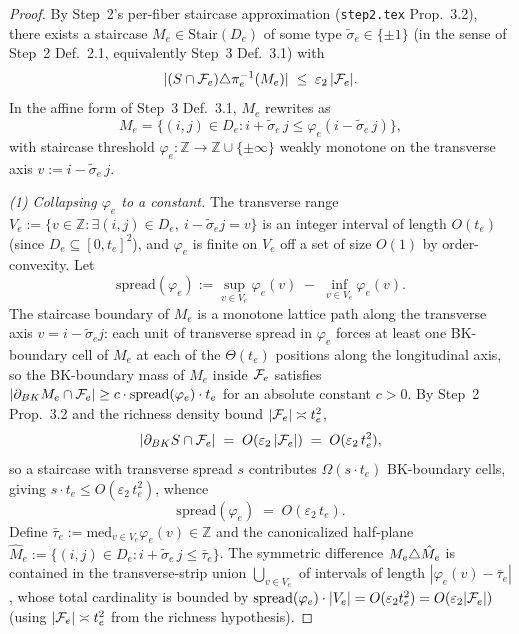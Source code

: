 \begin{proof}
By Step~2's per-fiber staircase approximation (\texttt{step2.tex}
Prop.~3.2), there exists a staircase
$M_e\in\mathrm{Stair}(D_e)$ of some type $\tilde\sigma_e\in\{\pm 1\}$
(in the sense of Step~2 Def.~2.1, equivalently Step~3 Def.~3.1) with
\[
  |(S\cap\mathcal{F}_{e})\triangle\pi_e^{-1}(M_e)| \;\le\; \varepsilon_2\,|\mathcal{F}_{e}|.
\]
In the affine form of Step~3 Def.~3.1, $M_e$ rewrites as
\begin{equation}\label{eq:affine-staircase}
  M_e = \bigl\{(i,j)\in D_e : i+\tilde\sigma_e\,j \le \varphi_e(i-\tilde\sigma_e\,j)\bigr\},
\end{equation}
with staircase threshold
$\varphi_e\colon\mathbb{Z}\to\mathbb{Z}\cup\{\pm\infty\}$ weakly
monotone on the transverse axis $v:=i-\tilde\sigma_e\,j$.

\smallskip
\noindent\emph{(1) Collapsing $\varphi_e$ to a constant.}
The transverse range
$V_e:=\{v\in\mathbb{Z}:\exists(i,j)\in D_e,\ i-\tilde\sigma_ej=v\}$
is an integer interval of length $O(t_e)$ (since $D_e\subseteq
[0,t_e]^2$), and $\varphi_e$ is finite on $V_e$ off a set of size
$O(1)$ by order-convexity.  Let
\[
  \mathrm{spread}(\varphi_e) := \sup_{v\in V_e}\varphi_e(v)\;-\;\inf_{v\in V_e}\varphi_e(v).
\]
The staircase boundary of $M_e$ is a monotone lattice path along the
transverse axis $v=i-\tilde\sigma_e j$: each unit of transverse spread
in $\varphi_e$ forces at least one BK-boundary cell of $M_e$ at each
of the $\Theta(t_e)$ positions along the longitudinal axis, so the
BK-boundary mass of $M_e$ inside $\mathcal{F}_{e}$ satisfies
$|\partial_{BK}M_e\cap\mathcal{F}_{e}|\ge c\cdot\mathrm{spread}(\varphi_e)\cdot t_e$
for an absolute constant $c>0$.  By Step~2 Prop.~3.2 and the richness
density bound $|\mathcal{F}_{e}|\asymp t_e^2$,
\[
  |\partial_{BK}S\cap\mathcal{F}_{e}| \;=\; O(\varepsilon_2\,|\mathcal{F}_{e}|)
  \;=\; O(\varepsilon_2\,t_e^2),
\]
so a staircase with transverse spread $s$ contributes
$\Omega(s\cdot t_e)$ BK-boundary cells, giving
$s\cdot t_e\le O(\varepsilon_2\,t_e^2)$, whence
\[
  \mathrm{spread}(\varphi_e) \;=\; O(\varepsilon_2\,t_e).
\]
Define $\bar\tau_e:=\mathrm{med}_{v\in V_e}\varphi_e(v)\in\mathbb{Z}$
and the canonicalized half-plane
$\hat M_e:=\{(i,j)\in D_e:i+\tilde\sigma_e\,j\le\bar\tau_e\}$.  The
symmetric difference $M_e\triangle\hat M_e$ is contained in the
transverse-strip union $\bigcup_{v\in V_e}$ of intervals of length
$|\varphi_e(v)-\bar\tau_e|$, whose total cardinality is bounded by
$\mathrm{spread}(\varphi_e)\cdot|V_e|=O(\varepsilon_2 t_e^2)
=O(\varepsilon_2|\mathcal{F}_{e}|)$ (using $|\mathcal{F}_{e}|\asymp t_e^2$ from
the richness hypothesis).


\end{proof}
